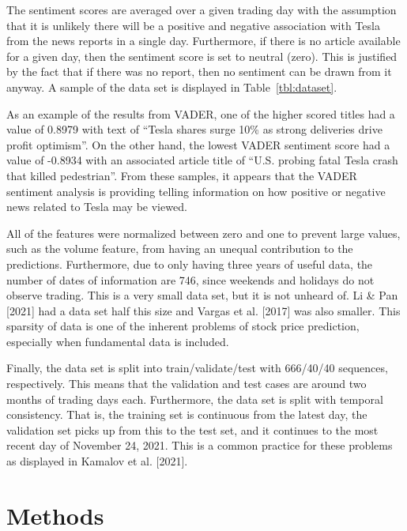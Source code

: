 \documentclass{article}
\begin{document}
The sentiment scores are averaged over a given trading day with the assumption
that it is unlikely there will be a positive and negative association with Tesla
from the news reports in a single day. Furthermore, if there is no article
available for a given day, then the sentiment score is set to neutral (zero).
This is justified by the fact that if there was no report, then no sentiment can
be drawn from it anyway. A sample of the data set is displayed in
Table~\ref{tbl:dataset}.

As an example of the results from VADER, one of the higher scored titles had a
value of 0.8979 with text of ``Tesla shares surge 10\% as strong deliveries
drive profit optimism''. On the other hand, the lowest VADER sentiment score had
a value of -0.8934 with an associated article title of ``U.S. probing fatal
Tesla crash that killed pedestrian''. From these samples, it appears that the
VADER sentiment analysis is providing telling information on how
positive or negative news related to Tesla may be viewed.

All of the features were normalized between zero and one to prevent large
values, such as the volume feature, from having an unequal contribution to the
predictions. Furthermore, due to only having three years of useful data, the
number of dates of information are 746, since weekends and holidays do not
observe trading. This is a very small data set, but it is not unheard of. Li \&
Pan [2021]
had a data set half this size and Vargas et al. [2017] was also smaller. This sparsity of data is
one of the inherent problems of stock price prediction, especially when
fundamental data is included.

Finally, the data set is split into train/validate/test with 666/40/40
sequences, respectively. This means that the validation and test cases are around two months
of trading days each. Furthermore, the data set is split with temporal
consistency. That is, the training set is continuous from the latest day, the
validation set picks up from this to the test set, and it continues to the most
recent day of November 24, 2021. This is a common practice for these problems as
displayed in Kamalov et al. [2021].

\section{Methods}
\end{document}
